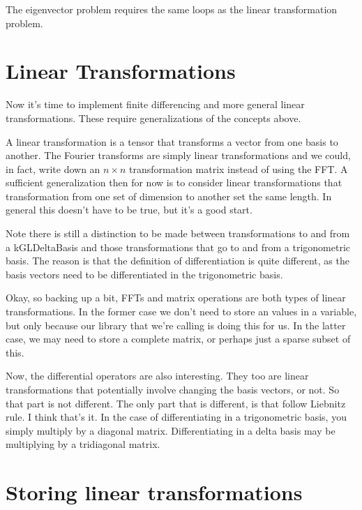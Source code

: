 \documentclass[11pt]{article}
\begin{document}
The eigenvector problem requires the same loops as the linear transformation problem.

%
\section{Linear Transformations}
%



Now it's time to implement finite differencing and more general linear transformations. These require generalizations of the concepts above.

A linear transformation is a tensor that transforms a vector from one basis to another. The Fourier transforms are simply linear transformations and we could, in fact, write down an $n \times n$ transformation matrix instead of using the FFT. A sufficient generalization then for now is to consider linear transformations that transformation from one set of dimension to another set the same length. In general this doesn't have to be true, but it's a good start.

Note there is still a distinction to be made between transformations to and from a kGLDeltaBasis and those transformations that go to and from a trigonometric basis. The reason is that the definition of differentiation is quite different, as the basis vectors need to be differentiated in the trigonometric basis.

Okay, so backing up a bit, FFTs and matrix operations are both types of linear transformations. In the former case we don't need to store an values in a variable, but only because our library that we're calling is doing this for us. In the latter case, we may need to store a complete matrix, or perhaps just a sparse subset of this.

Now, the differential operators are also interesting. They too are linear transformations that potentially involve changing the basis vectors, or not. So that part is not different. The only part that is different, is that follow Liebnitz rule. I think that's it. In the case of differentiating in a trigonometric basis, you simply multiply by a diagonal matrix. Differentiating in a delta basis may be multiplying by a tridiagonal matrix.

%
%

\section{Storing linear transformations}
\end{document}
